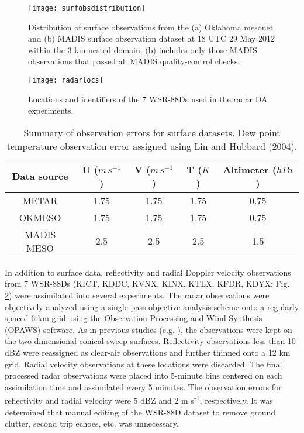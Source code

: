 \begin{figure}
\centering
\texttt{[image: surfobsdistribution]}
\caption{Distribution of surface observations from the (a) Oklahoma mesonet and (b) MADIS surface observation dataset at 18 UTC 29 May 2012 within the 3-km nested domain. (b) includes only those MADIS observations that passed all MADIS quality-control checks.}
\label{surfobsdistribution}
\end{figure}

\begin{figure}
\centering
\texttt{[image: radarlocs]}
\caption{Locations and identifiers of the 7 WSR-88Ds used in the radar DA experiments.}
\label{radarlocs}
\end{figure}

\begin{table}
\centering
\begin{tabular}{ c || c | c | c | c }
{\bf Data source} & {\bf U (\(m\,s^{-1}\))} & {\bf V (\(m\,s^{-1}\))} & {\bf T (\(K\))} & {\bf Altimeter (\(hPa\))} \\
\hline \hline
METAR & 1.75 & 1.75 & 1.75 & 0.75 \\
\hline
OKMESO & 1.75 & 1.75 & 1.75 & 0.75 \\
\hline
MADIS MESO & 2.5 & 2.5 & 2.5 & 1.5 \\
\end{tabular}
\caption{Summary of observation errors for surface datasets. Dew point temperature observation error assigned using Lin and Hubbard (2004).}
\label{errortable}
\end{table}

In addition to surface data, reflectivity and radial Doppler velocity observations from 7 WSR-88Ds (KICT, KDDC, KVNX, KINX, KTLX, KFDR, KDYX; Fig. \ref{radarlocs}) were assimilated into several experiments. The radar observations were objectively analyzed using a single-pass \citet{barnes64} objective analysis scheme onto a regularly spaced 6 km grid using the Observation Processing and Wind Synthesis (OPAWS) software. As in previous studies (e.g. \citealt{dowelletal04,xueetal06}), the observations were kept on the two-dimensional conical sweep surfaces. Reflectivity observations less than 10 dBZ were reassigned as clear-air observations and further thinned onto a 12 km grid. Radial velocity observations at these locations were discarded. The final processed radar observations were placed into 5-minute bins centered on each assimilation time and assimilated every 5 minutes. The observation errors for reflectivity and radial velocity were 5 dBZ and 2 m s\textsuperscript{-1}, respectively. It was determined that manual editing of the WSR-88D dataset to remove ground clutter, second trip echoes, etc. was unnecessary.

